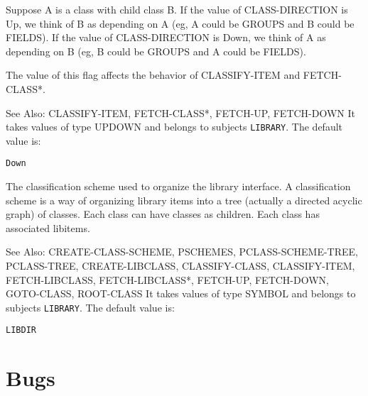\begin{description} 
\item[CLASS-DIRECTION]  
Suppose A is a class with child class B.
If the value of CLASS-DIRECTION is Up, we think of
B as depending on A (eg, A could be GROUPS and B could be FIELDS).
If the value of CLASS-DIRECTION is Down, we think of
A as depending on B (eg, B could be GROUPS and A could be FIELDS).

The value of this flag affects the behavior of CLASSIFY-ITEM
and FETCH-CLASS*.

See Also: CLASSIFY-ITEM, FETCH-CLASS*, FETCH-UP, FETCH-DOWN
It takes values of type UPDOWN and belongs to subjects \texttt{LIBRARY}.  The default value is: \begin{lstlisting}
Down
\end{lstlisting}

\item[CLASS-SCHEME]  
The classification scheme used to organize the library interface.
A classification scheme is a way of organizing library items into a tree 
(actually a directed acyclic graph) of classes.  Each class can have 
classes as children.  Each class has associated libitems.

See Also: CREATE-CLASS-SCHEME, PSCHEMES, PCLASS-SCHEME-TREE, 
PCLASS-TREE, CREATE-LIBCLASS, CLASSIFY-CLASS, CLASSIFY-ITEM, 
FETCH-LIBCLASS, FETCH-LIBCLASS*, FETCH-UP, FETCH-DOWN,
GOTO-CLASS, ROOT-CLASS
It takes values of type SYMBOL and belongs to subjects \texttt{LIBRARY}.  The default value is: \begin{lstlisting}
LIBDIR
\end{lstlisting}

\item
\end{description}

\section{Bugs}

